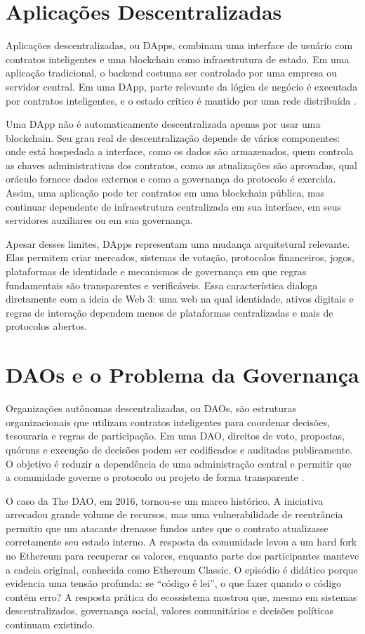 \documentclass[12pt,a4paper]{report}
\begin{document}
\section{Aplicações Descentralizadas}

Aplicações descentralizadas, ou DApps, combinam uma interface de usuário com contratos inteligentes e uma blockchain como infraestrutura de estado. Em uma aplicação tradicional, o backend costuma ser controlado por uma empresa ou servidor central. Em uma DApp, parte relevante da lógica de negócio é executada por contratos inteligentes, e o estado crítico é mantido por uma rede distribuída \cite{Bashir2023}.

Uma DApp não é automaticamente descentralizada apenas por usar uma blockchain. Seu grau real de descentralização depende de vários componentes: onde está hospedada a interface, como os dados são armazenados, quem controla as chaves administrativas dos contratos, como as atualizações são aprovadas, qual oráculo fornece dados externos e como a governança do protocolo é exercida. Assim, uma aplicação pode ter contratos em uma blockchain pública, mas continuar dependente de infraestrutura centralizada em sua interface, em seus servidores auxiliares ou em sua governança.

Apesar desses limites, DApps representam uma mudança arquitetural relevante. Elas permitem criar mercados, sistemas de votação, protocolos financeiros, jogos, plataformas de identidade e mecanismos de governança em que regras fundamentais são transparentes e verificáveis. Essa característica dialoga diretamente com a ideia de Web 3: uma web na qual identidade, ativos digitais e regras de interação dependem menos de plataformas centralizadas e mais de protocolos abertos.

\section{DAOs e o Problema da Governança}

Organizações autônomas descentralizadas, ou DAOs, são estruturas organizacionais que utilizam contratos inteligentes para coordenar decisões, tesouraria e regras de participação. Em uma DAO, direitos de voto, propostas, quóruns e execução de decisões podem ser codificados e auditados publicamente. O objetivo é reduzir a dependência de uma administração central e permitir que a comunidade governe o protocolo ou projeto de forma transparente \cite{Bashir2023}.

O caso da The DAO, em 2016, tornou-se um marco histórico. A iniciativa arrecadou grande volume de recursos, mas uma vulnerabilidade de reentrância permitiu que um atacante drenasse fundos antes que o contrato atualizasse corretamente seu estado interno. A resposta da comunidade levou a um hard fork no Ethereum para recuperar os valores, enquanto parte dos participantes manteve a cadeia original, conhecida como Ethereum Classic. O episódio é didático porque evidencia uma tensão profunda: se ``código é lei'', o que fazer quando o código contém erro? A resposta prática do ecossistema mostrou que, mesmo em sistemas descentralizados, governança social, valores comunitários e decisões políticas continuam existindo.
\end{document}
